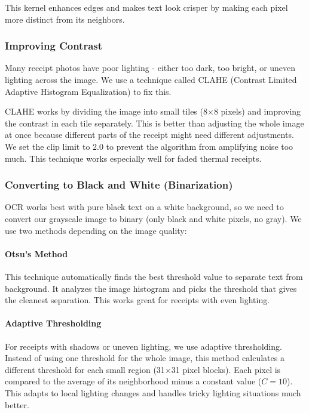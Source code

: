 This kernel enhances edges and makes text look crisper by making each pixel more distinct from its neighbors.

\subsubsection{Improving Contrast}

Many receipt photos have poor lighting - either too dark, too bright, or uneven lighting across the image. We use a technique called CLAHE (Contrast Limited Adaptive Histogram Equalization) to fix this.

CLAHE works by dividing the image into small tiles (8$\times$8 pixels) and improving the contrast in each tile separately. This is better than adjusting the whole image at once because different parts of the receipt might need different adjustments. We set the clip limit to 2.0 to prevent the algorithm from amplifying noise too much. This technique works especially well for faded thermal receipts.

\subsubsection{Converting to Black and White (Binarization)}

OCR works best with pure black text on a white background, so we need to convert our grayscale image to binary (only black and white pixels, no gray). We use two methods depending on the image quality:

\paragraph{Otsu's Method}
This technique automatically finds the best threshold value to separate text from background. It analyzes the image histogram and picks the threshold that gives the cleanest separation. This works great for receipts with even lighting.

\paragraph{Adaptive Thresholding}
For receipts with shadows or uneven lighting, we use adaptive thresholding. Instead of using one threshold for the whole image, this method calculates a different threshold for each small region (31$\times$31 pixel blocks). Each pixel is compared to the average of its neighborhood minus a constant value ($C=10$). This adapts to local lighting changes and handles tricky lighting situations much better.


